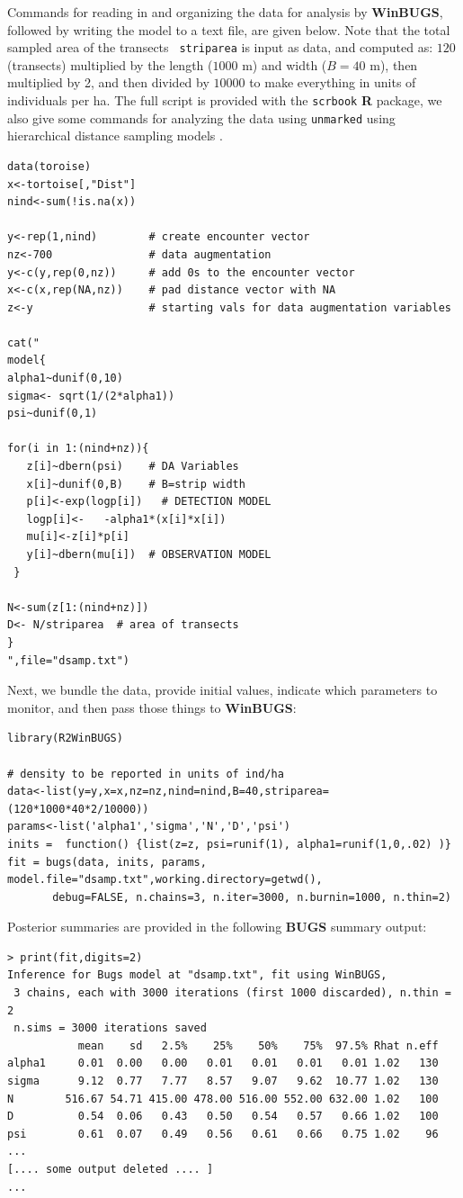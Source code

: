 Commands for reading in and organizing the data for analysis by {\bf
  WinBUGS}, followed by writing the model to a text file, are given
below. Note that the total sampled area of the transects \mbox{\tt
  striparea} is input as data, and computed as: $120$ (transects)
multiplied by the length ($1000$ m) and width ($B=40$ m), then
multiplied by 2, and then divided by $10000$ to make everything in
units of individuals  per ha. The full script is provided with the
\mbox{\tt scrbook} {\bf R} package, we also give some commands for
analyzing the data using \mbox{\tt unmarked}
\citep{fiske_chandler:2011} using hierarchical distance sampling
models \citep{royle_etal:2004}.  {\small
{\small
\begin{verbatim}
data(toroise)
x<-tortoise[,"Dist"]
nind<-sum(!is.na(x))

y<-rep(1,nind)        # create encounter vector
nz<-700               # data augmentation
y<-c(y,rep(0,nz))     # add 0s to the encounter vector
x<-c(x,rep(NA,nz))    # pad distance vector with NA
z<-y                  # starting vals for data augmentation variables

cat("
model{
alpha1~dunif(0,10)
sigma<- sqrt(1/(2*alpha1))
psi~dunif(0,1)

for(i in 1:(nind+nz)){
   z[i]~dbern(psi)    # DA Variables
   x[i]~dunif(0,B)    # B=strip width
   p[i]<-exp(logp[i])   # DETECTION MODEL
   logp[i]<-   -alpha1*(x[i]*x[i])
   mu[i]<-z[i]*p[i]
   y[i]~dbern(mu[i])  # OBSERVATION MODEL
 }

N<-sum(z[1:(nind+nz)])
D<- N/striparea  # area of transects
}
",file="dsamp.txt")
\end{verbatim}
}
}
Next, we bundle the data,
provide initial values, indicate which parameters to monitor, and then
pass those things to {\bf WinBUGS}:
{\small
\begin{verbatim}
library(R2WinBUGS)

# density to be reported in units of ind/ha
data<-list(y=y,x=x,nz=nz,nind=nind,B=40,striparea=(120*1000*40*2/10000))
params<-list('alpha1','sigma','N','D','psi')
inits =  function() {list(z=z, psi=runif(1), alpha1=runif(1,0,.02) )}
fit = bugs(data, inits, params, model.file="dsamp.txt",working.directory=getwd(),
       debug=FALSE, n.chains=3, n.iter=3000, n.burnin=1000, n.thin=2)
\end{verbatim}
}
Posterior summaries are provided in the following \mbox{\bf BUGS} summary
output:
{\small
\begin{verbatim}
> print(fit,digits=2)
Inference for Bugs model at "dsamp.txt", fit using WinBUGS,
 3 chains, each with 3000 iterations (first 1000 discarded), n.thin = 2
 n.sims = 3000 iterations saved
           mean    sd   2.5%    25%    50%    75%  97.5% Rhat n.eff
alpha1     0.01  0.00   0.00   0.01   0.01   0.01   0.01 1.02   130
sigma      9.12  0.77   7.77   8.57   9.07   9.62  10.77 1.02   130
N        516.67 54.71 415.00 478.00 516.00 552.00 632.00 1.02   100
D          0.54  0.06   0.43   0.50   0.54   0.57   0.66 1.02   100
psi        0.61  0.07   0.49   0.56   0.61   0.66   0.75 1.02    96
...
[.... some output deleted .... ]
...
\end{verbatim}
}
